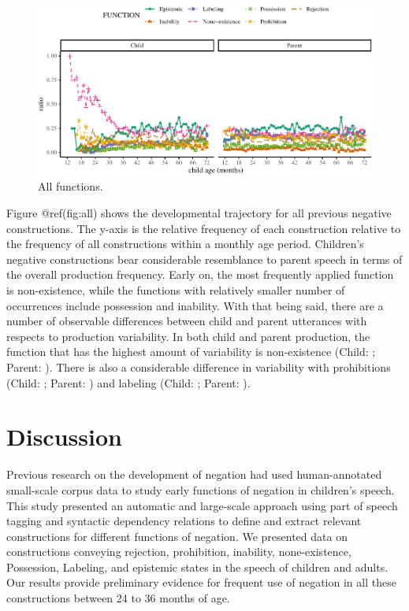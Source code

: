 \documentclass[10pt, letterpaper]{article}
\newenvironment{CodeChunk}{}{}
\begin{document}
\begin{figure}[h]
\begin{CodeChunk}


\begin{center}\includegraphics{figs/all-1} \end{center}

\end{CodeChunk}
\caption[This image spans both columns]{All functions.}\label{fig:all}
\end{figure}

Figure @ref(fig:all) shows the developmental trajectory for all previous
negative constructions. The y-axis is the relative frequency of each
construction relative to the frequency of all constructions within a
monthly age period. Children's negative constructions bear considerable
resemblance to parent speech in terms of the overall production
frequency. Early on, the most frequently applied function is
non-existence, while the functions with relatively smaller number of
occurrences include possession and inability. With that being said,
there are a number of observable differences between child and parent
utterances with respects to production variability. In both child and
parent production, the function that has the highest amount of
variability is non-existence (Child: ; Parent: ). There is also a
considerable difference in variability with prohibitions (Child: ;
Parent: ) and labeling (Child: ; Parent: ).

\hypertarget{discussion}{%
\section{Discussion}\label{discussion}}

Previous research on the development of negation had used
human-annotated small-scale corpus data to study early functions of
negation in children's speech. This study presented an automatic and
large-scale approach using part of speech tagging and syntactic
dependency relations to define and extract relevant constructions for
different functions of negation. We presented data on constructions
conveying rejection, prohibition, inability, none-existence, Possession,
Labeling, and epistemic states in the speech of children and adults. Our
results provide preliminary evidence for frequent use of negation in all
these constructions between 24 to 36 months of age.
\end{document}
